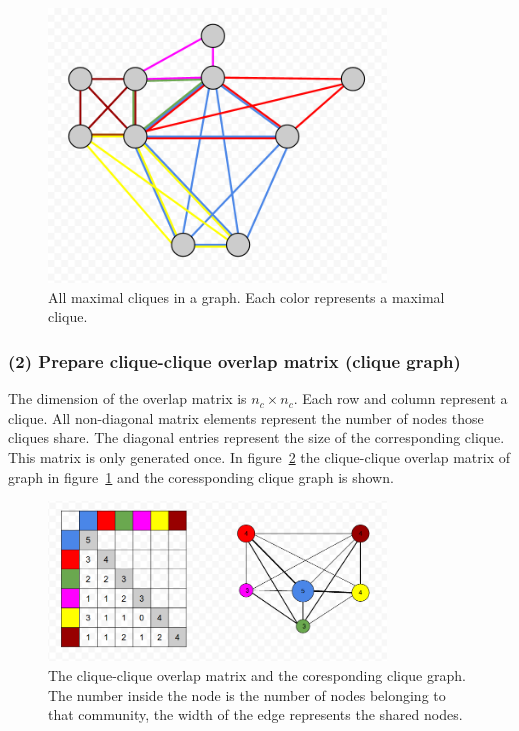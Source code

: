 \documentclass[runningheads,a4paper]{llncs}
\begin{document}
\begin{figure}
\begin{center}
	\includegraphics[width=0.8\textwidth]{allmaxcliques.png}
		\caption{All maximal cliques in a graph. Each color represents a maximal clique.}
		\label{fig:allmaxcliques}
\end{center}
\end{figure}

\subsubsection{(2) Prepare clique-clique overlap matrix (clique graph)}
The dimension of the overlap matrix is $n_c \times n_c$. Each row and column represent a clique.
All non-diagonal matrix elements represent the number of nodes those cliques share.
The diagonal entries represent the size of the corresponding clique.
This matrix is only generated once.
In figure~\ref{fig:matrix} the clique-clique overlap matrix of graph in figure~\ref{fig:allmaxcliques} and the coressponding clique graph is shown.

\begin{figure}
\begin{center}
	\includegraphics[width=0.8\textwidth]{matrix.png}
		\caption{The clique-clique overlap matrix and the coresponding clique graph. The number inside the node is the number of nodes belonging to that community, the width of the edge represents the shared nodes.}
		\label{fig:matrix}
\end{center}		
\end{figure}
\end{document}
